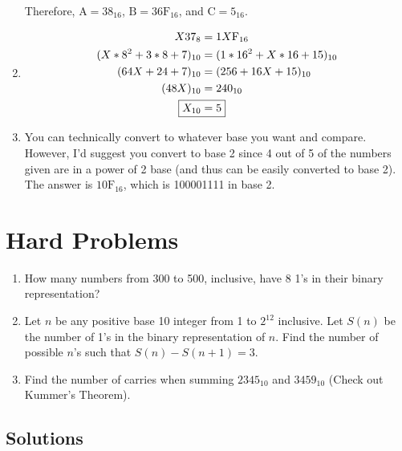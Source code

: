 \documentclass{pset_template}
\begin{document}
\begin{enumerate}
Therefore, $\text{A} = 38_{16}$, $\boxed{\text{B} = \text{36F}_{16}}$, and $\text{C} = 5_{16}$.

\item
\begin{align*}
X37_8 &= 1X\text{F}_{16}\\
(X * 8^2 + 3 * 8 + 7)_{10} &= (1 * 16^2 + X * 16 + 15)_{10}\\
(64X + 24 + 7)_{10} &= (256 + 16X + 15)_{10}\\
(48X)_{10} &= 240_{10}\\
\Aboxed{X_{10} &= 5}
\end{align*}

\item
You can technically convert to whatever base you want and compare. 
However, I'd suggest you convert to base 2 since 4 out of 5 of the numbers given are in a power of 2 base
(and thus can be easily converted to base 2).
The answer is $\boxed{\text{10F}_{16}}$, which is 100001111 in base 2.

\end{enumerate}


\section{Hard Problems}

\begin{enumerate}

\item
How many numbers from 300 to 500, inclusive, have 8 1's in their binary representation?

\item
Let $n$ be any positive base 10 integer from 1 to $2^{12}$ inclusive. 
Let $S(n)$ be the number of 1's in the binary representation of $n$.
Find the number of possible $n$'s such that $S(n) - S(n + 1) = 3$.

\item
Find the number of carries when summing $2345_{10}$ and $3459_{10}$ 
(Check out Kummer's Theorem).

\end{enumerate}


\subsection{Solutions}
\end{document}
